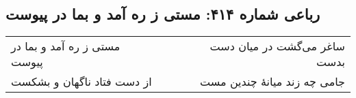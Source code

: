 \begin{center}
\section*{رباعی شماره ۴۱۴: مستی ز ره آمد و بما در پیوست}
\label{sec:0414}
\begin{longtable}{l p{0.5cm} r}
مستی ز ره آمد و بما در پیوست
&&
ساغر می‌گشت در میان دست بدست
\\
از دست فتاد ناگهان و بشکست
&&
جامی چه زند میانهٔ چندین مست
\\
\end{longtable}
\end{center}
